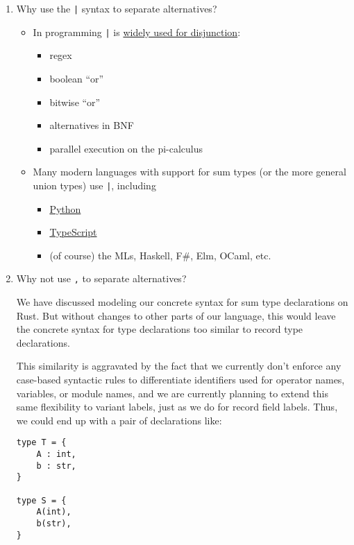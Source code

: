 \documentclass[11pt]{article}
\begin{document}
\begin{enumerate}
\item Why use the \texttt{|} syntax to separate alternatives?
\label{sec:org28bcecf}

\begin{itemize}
\item In programming \texttt{|} is \href{https://en.wikipedia.org/wiki/Vertical\_bar\#Disjunction}{widely used for disjunction}:
\begin{itemize}
\item regex
\item boolean ``or''
\item bitwise ``or''
\item alternatives in BNF
\item parallel execution on the pi-calculus
\end{itemize}
\item Many modern languages with support for sum types (or the more general union
types) use \texttt{|}, including
\begin{itemize}
\item \href{https://docs.python.org/3/library/typing.html\#typing.Union}{Python}
\item \href{https://www.typescriptlang.org/docs/handbook/2/everyday-types.html\#union-types}{TypeScript}
\item (of course) the MLs, Haskell, F\#, Elm, OCaml, etc.
\end{itemize}
\end{itemize}

\item Why not use \texttt{,} to separate alternatives?
\label{sec:org2713c71}

We have discussed modeling our concrete syntax for sum type declarations on
Rust. But without changes to other parts of our language, this would leave the
concrete syntax for type declarations too similar to record type declarations.

This similarity is aggravated by the fact that we currently don't enforce any
case-based syntactic rules to differentiate identifiers used for  operator
names, variables, or module names, and we are currently planning to extend this
same flexibility to variant labels, just as we do for record field labels.
Thus, we could end up with a pair of declarations like:

\begin{verbatim}
type T = {
    A : int,
    b : str,
}

type S = {
    A(int),
    b(str),
}
\end{verbatim}


\end{enumerate}
\end{document}
